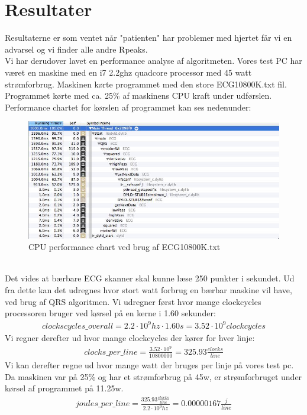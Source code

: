 \documentclass[a4paper,12pt]{article}
\begin{document}
\section{Resultater}
Resultaterne er som ventet når "patienten" har problemer med hjertet får vi en advarsel og vi finder alle andre Rpeaks.\\
Vi har derudover lavet en performance analyse af algoritmeten. Vores test PC har været en maskine med en i7 2.2ghz quadcore processor med 45 watt strømforbrug. Maskinen kørte programmet med den store ECG10800K.txt fil. Programmet kørte med ca. 25\% af maskinens CPU kraft under udførslen. Performance chartet for kørslen af programmet kan ses nedenunder:
\begin{figure}[htp]
\centering
\includegraphics[scale=0.6]{CPUperformance.jpg}
\caption{CPU performance chart ved brug af ECG10800K.txt}
\label{CPU performance chart ved brug af ECG10800K.txt}
\end{figure}\\
Det vides at bærbare ECG skanner skal kunne læse 250 punkter i sekundet. Ud fra dette kan det udregnes hvor stort watt forbrug en bærbar maskine vil have, ved brug af QRS algoritmen. Vi udregner først hvor mange clockcycles processoren bruger ved kørsel på en kerne i 1.60 sekunder:
\begin{align*}
clockscycles\_overall = 2.2 \cdot 10^9 hz \cdot 1.60s	 = 3.52 \cdot 10^9 clockcycles
\end{align*}
Vi regner derefter ud hvor mange clockcycles der kører for hver linje:
\begin{align*}
clocks\_per\_line = \frac{3.52 \cdot 10^9}{10800000 } = 325.93 \frac{clocks}{line}
\end{align*}
Vi kan derefter regne ud hvor mange watt der bruges per linje på vores test pc. Da maskinen var på 25\% og har et strømforbrug på 45w, er strømforbruget under kørsel af programmet på 11.25w.
\begin{align*}
joules\_per\_line = \frac{325.93 \frac{clocks}{line}}{2.2 \cdot 10^9hz} = 0.00000167 \frac{j}{line}
\end{align*}
\end{document}
